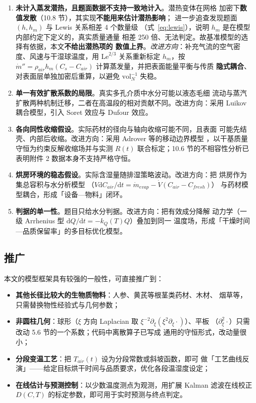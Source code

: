 \begin{enumerate}
    \item \textbf{未计入蒸发潜热，且题面数据不支持一致地计入}。潜热变体在网格
  加密下\textbf{数值发散}（10.8 节），其实现\textbf{不能用来估计潜热影响}；
  进一步追查发现题面 $(h,h_m)$ 与 Lewis 关系相差 4 个数量级
  （式~\eqref{eq:lewis}），说明 $h_m$ 是在模型内部约定下定义的，真实质量通量
  相差 250 倍、无法判定。故基准模型的选择有依据，本文\textbf{不给出潜热项的
  数值上界}。\textit{改进方向}：补充气流的空气密度、风速与干湿球温度，用
  $\mathrm{Le}^{2/3}$ 关系重新标定 $h_m$，按
  $\dot m''=\rho_{air}h_m(C_s-C_{air})$ 计算蒸发量，并把表面能量平衡与传质
  \textbf{隐式耦合}、对表面层单独加密后重算，以避免 $\mathrm{vol}_N^{-1}$
  失稳。    \item \textbf{单一有效扩散系数的局限}。真实多孔介质中水分可能以液态毛细
  流动与蒸汽扩散两种机制迁移，二者在高温段的相对贡献不同。改进方向：采用
  Luikov 耦合模型\cite{luikov1966}，引入 Soret 效应与 Dufour 效应。
  \item \textbf{各向同性收缩假设}。实际药材的径向与轴向收缩可能不同，且表面
  可能先结壳、内部后收缩。改进方向：采用 Adrover 等的移动边界模型
  \cite{adrover2019a,adrover2019b}，以干基质量守恒为约束反解收缩场并与实测
  $R(t)$ 联合标定；10.6 节的不相容性分析已表明附件 2 数据本身不支持严格守恒。
  \item \textbf{烘房环境的稳态假设}。实际含湿量随排湿策略波动。改进方向：把
  烘房作为集总容积与水分析模型
  （$V\mathrm{d}C_{air}/\mathrm{d}t=\dot m_{evap}-\dot V(C_{air}-C_{fresh})$）
  与药材模型耦合，形成「设备—物料」闭环。
  \item \textbf{判据的单一性}。题目只给水分判据。改进方向：把有效成分降解
  动力学（一级 Arrhenius 型 $\mathrm{d}Q/\mathrm{d}t=-k_Q(T)Q$）叠加到同一
  温度场，形成「干燥时间—品质保留率」的多目标优化模型。
\end{enumerate}

\subsection{推广}

本文的模型框架具有较强的一般性，可直接推广到：

\begin{itemize}
    \item \textbf{其他长径比较大的生物质物料}：人参、黄芪等根茎类药材、木材、
  烟草等，只需替换物性经验式与几何参数；
  \item \textbf{非圆柱几何}：球形（$\xi$ 方向 Laplacian 取
  $\xi^{-2}\partial_\xi(\xi^2\partial_\xi\cdot)$）、平板
  （$\partial_\xi^2\cdot$）只需改动 5.6 节的一个系数；代码中离散算子已写成
  通用的守恒形式，改动量很小；
  \item \textbf{分段变温工艺}：把 $T_{air}(t)$ 设为分段常数或斜坡函数，即可
  做「工艺曲线反演」——给定目标烘干时间与品质要求，优化各段温湿度设定；
  \item \textbf{在线估计与预测控制}：以少数温度测点为观测，用扩展 Kalman
  滤波在线校正 $D(C,T)$ 的标定参数，即可用于实时预测与终点判定。
\end{itemize}

